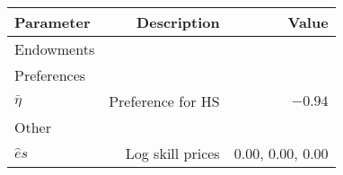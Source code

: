 \begin{tabular}{lrr}
\hline
Parameter & Description  & Value  \\ 
\hline
Endowments &   &   \\ 
Preferences &   &   \\ 
$\bar{\eta}$ & Preference for HS  & $-0.94$  \\ 
Other &   &   \\ 
$\hat{e}{s}$ & Log skill prices  & 0.00, 0.00, 0.00  \\ 
\hline
\end{tabular}%
